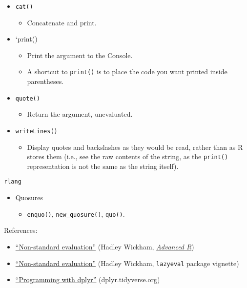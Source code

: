 \documentclass[
]{book}
\providecommand{\tightlist}{%
  \setlength{\itemsep}{0pt}\setlength{\parskip}{0pt}}
\begin{document}
\begin{itemize}
\tightlist
\item
  \texttt{cat()}

  \begin{itemize}
  \tightlist
  \item
    Concatenate and print.
  \end{itemize}
\item
  `print()

  \begin{itemize}
  \tightlist
  \item
    Print the argument to the Console.
  \item
    A shortcut to \texttt{print()} is to place the code you want printed inside parentheses.
  \end{itemize}
\item
  \texttt{quote()}

  \begin{itemize}
  \tightlist
  \item
    Return the argument, unevaluated.
  \end{itemize}
\item
  \texttt{writeLines()}

  \begin{itemize}
  \tightlist
  \item
    Display quotes and backslashes as they would be read, rather than as R stores them (i.e., see the raw contents of the string, as the \texttt{print()} representation is not the same as the string itself).
  \end{itemize}
\end{itemize}

\texttt{rlang}

\begin{itemize}
\tightlist
\item
  Quosures

  \begin{itemize}
  \tightlist
  \item
    \texttt{enquo()}, \texttt{new\_quosure()}, \texttt{quo()}.
  \end{itemize}
\end{itemize}

References:

\begin{itemize}
\tightlist
\item
  \href{http://adv-r.had.co.nz/Computing-on-the-language.html}{``Non-standard evaluation''} (Hadley Wickham, \href{http://adv-r.had.co.nz/}{\emph{Advanced R}})
\item
  \href{https://cran.r-project.org/web/packages/lazyeval/vignettes/lazyeval.html}{``Non-standard evaluation''} (Hadley Wickham, \texttt{lazyeval} package vignette)
\item
  \href{https://dplyr.tidyverse.org/articles/programming.html}{``Programming with dplyr''} (dplyr.tidyverse.org)
\end{itemize}
\end{document}
